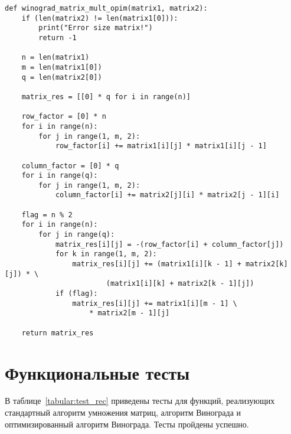 \begin{lstlisting}[label=lst:vinograd_opt,caption=Реализация алгоритма Копперсмита-Винограда (оптимизированный)]
def winograd_matrix_mult_opim(matrix1, matrix2):
	if (len(matrix2) != len(matrix1[0])):
		print("Error size matrix!")
		return -1
	
	n = len(matrix1)
	m = len(matrix1[0])
	q = len(matrix2[0])
	
	matrix_res = [[0] * q for i in range(n)]
	
	row_factor = [0] * n
	for i in range(n):
		for j in range(1, m, 2):
			row_factor[i] += matrix1[i][j] * matrix1[i][j - 1]
	
	column_factor = [0] * q
	for i in range(q):
		for j in range(1, m, 2):
			column_factor[i] += matrix2[j][i] * matrix2[j - 1][i]
	
	flag = n % 2
	for i in range(n):
		for j in range(q):
			matrix_res[i][j] = -(row_factor[i] + column_factor[j])
			for k in range(1, m, 2):
				matrix_res[i][j] += (matrix1[i][k - 1] + matrix2[k][j]) * \
						(matrix1[i][k] + matrix2[k - 1][j])
			if (flag):
				matrix_res[i][j] += matrix1[i][m - 1] \
					* matrix2[m - 1][j]

	return matrix_res
\end{lstlisting}


\section{Функциональные тесты}

В таблице~\ref{tabular:test_rec} приведены тесты для функций, реализующих стандартный алгоритм умножения матриц, алгоритм Винограда и оптимизированный алгоритм Винограда. Тесты пройдены успешно.

\clearpage

